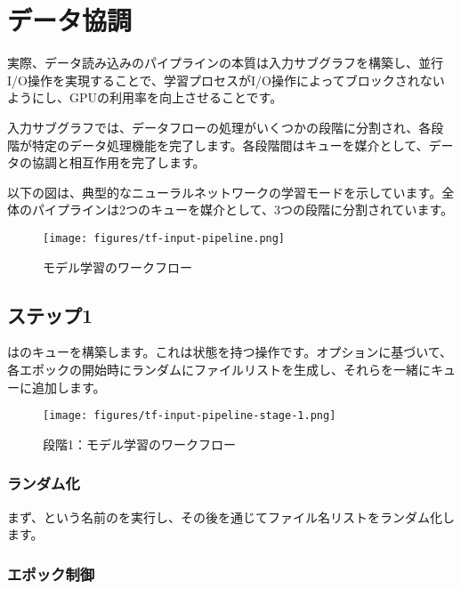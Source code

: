 \section{データ協調}

\begin{content}

実際、データ読み込みのパイプラインの本質は入力サブグラフを構築し、並行I/O操作を実現することで、学習プロセスがI/O操作によってブロックされないようにし、GPUの利用率を向上させることです。

入力サブグラフでは、データフローの処理がいくつかの段階に分割され、各段階が特定のデータ処理機能を完了します。各段階間はキューを媒介として、データの協調と相互作用を完了します。

以下の図は、典型的なニューラルネットワークの学習モードを示しています。全体のパイプラインは2つのキューを媒介として、3つの段階に分割されています。

\begin{figure}[!htbp]
\centering
\texttt{[image: figures/tf-input-pipeline.png]}
\caption{モデル学習のワークフロー}
 \label{fig:tf-input-pipeline}
\end{figure}

\subsection{ステップ1}

はのキューを構築します。これは状態を持つ操作です。オプションに基づいて、各エポックの開始時にランダムにファイルリストを生成し、それらを一緒にキューに追加します。

\begin{figure}[!htbp]
\centering
\texttt{[image: figures/tf-input-pipeline-stage-1.png]}
\caption{段階1：モデル学習のワークフロー}
 \label{fig:tf-input-pipeline-stage-1}
\end{figure}

\subsubsection{ランダム化}

まず、という名前のを実行し、その後を通じてファイル名リストをランダム化します。

\subsubsection{エポック制御}


\end{content}
